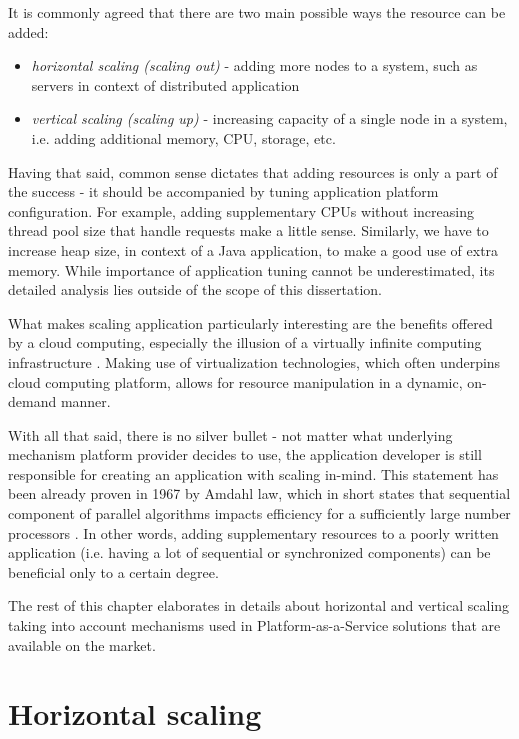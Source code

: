 It is commonly agreed that there are two main possible ways the resource can be added:
\begin{itemize}
	\item \textit{horizontal scaling (scaling out)} - adding more nodes to a system, such as servers in context of distributed application
	\item \textit{vertical scaling (scaling up)} - increasing capacity of a single node in a system, i.e. adding additional memory, CPU, storage, etc.
\end{itemize}

Having that said, common sense dictates that adding resources is only a part of the success - it should be accompanied by tuning application platform configuration. For example, adding supplementary CPUs without increasing thread pool size that handle requests make a little sense. Similarly, we have to increase heap size, in context of a Java application, to make a good use of extra memory. While importance of application tuning cannot be underestimated, its detailed analysis lies outside of the scope of this dissertation.

What makes scaling application particularly interesting are the benefits offered by a cloud computing, especially the illusion of a virtually infinite computing infrastructure \cite{VaRoBu11}. Making use of virtualization technologies, which often underpins cloud computing platform, allows for resource manipulation in a dynamic, on-demand manner.

With all that said, there is no silver bullet - not matter what underlying mechanism platform provider decides to use, the application developer is still responsible for creating an application with scaling in-mind. This statement has been already proven in 1967 by Amdahl law, which in short states that sequential component of parallel algorithms impacts efficiency for a sufficiently large number processors \cite{Am67}. In other words, adding supplementary resources to a poorly written application (i.e. having a lot of sequential or synchronized components) can be beneficial only to a certain degree.

The rest of this chapter elaborates in details about horizontal and vertical scaling taking into account mechanisms used in Platform-as-a-Service solutions that are available on the market.

\section{Horizontal scaling}


